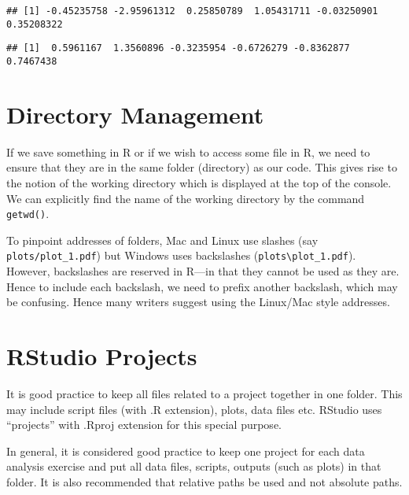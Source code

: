 \documentclass[11pt,]{article}
\newenvironment{Shaded}{\begin{snugshade}}{\end{snugshade}}
\newcommand{\KeywordTok}[1]{\textcolor[rgb]{0.13,0.29,0.53}{\textbf{#1}}}
\newcommand{\DecValTok}[1]{\textcolor[rgb]{0.00,0.00,0.81}{#1}}
\newcommand{\StringTok}[1]{\textcolor[rgb]{0.31,0.60,0.02}{#1}}
\newcommand{\OperatorTok}[1]{\textcolor[rgb]{0.81,0.36,0.00}{\textbf{#1}}}
\newcommand{\NormalTok}[1]{#1}
\begin{document}
\begin{Shaded}
\end{Shaded}

\begin{verbatim}
## [1] -0.45235758 -2.95961312  0.25850789  1.05431711 -0.03250901  0.35208322
\end{verbatim}

\begin{Shaded}
\end{Shaded}

\begin{verbatim}
## [1]  0.5961167  1.3560896 -0.3235954 -0.6726279 -0.8362877  0.7467438
\end{verbatim}

\section{Directory Management}\label{directory-management}

If we save something in R or if we wish to access some file in R, we
need to ensure that they are in the same folder (directory) as our code.
This gives rise to the notion of the working directory which is
displayed at the top of the console. We can explicitly find the name of
the working directory by the command \texttt{getwd()}.

To pinpoint addresses of folders, Mac and Linux use slashes (say
\texttt{plots/plot\_1.pdf}) but Windows uses backslashes
(\texttt{plots\textbackslash{}plot\_1.pdf}). However, backslashes are
reserved in R---in that they cannot be used as they are. Hence to
include each backslash, we need to prefix another backslash, which may
be confusing. Hence many writers suggest using the Linux/Mac style
addresses.

\section{RStudio Projects}\label{rstudio-projects}

It is good practice to keep all files related to a project together in
one folder. This may include script files (with .R extension), plots,
data files etc. RStudio uses ``projects'' with .Rproj extension for this
special purpose.

In general, it is considered good practice to keep one project for each
data analysis exercise and put all data files, scripts, outputs (such as
plots) in that folder. It is also recommended that relative paths be
used and not absolute paths.
\end{document}
